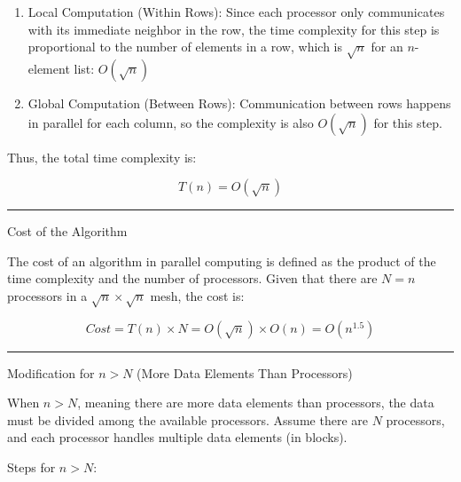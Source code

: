 \documentclass[a4paper,10pt]{article}
\begin{document}
    \begin{enumerate}
        
        \item Local Computation (Within Rows): Since each processor only communicates with its immediate neighbor in the row, the time complexity for this step is proportional to the number of elements in a row, which is $\sqrt{n}$ for an $n$-element list: $O(\sqrt{n})$

        \item Global Computation (Between Rows): Communication between rows happens in parallel for each column, so the complexity is also $O(\sqrt{n})$ for this step.

    \end{enumerate}

    Thus, the total time complexity is:

    $$T(n)= O(\sqrt{n})$$

    \begin{center}
        \noindent\rule{0.5\linewidth}{0.4pt}
    \end{center}


    {\bold Cost of the Algorithm}

    The cost of an algorithm in parallel computing is defined as the product of the time complexity and the number of processors. Given that there are $N=n$ processors in a $\sqrt{n} \times \sqrt{n}$ mesh, the cost is: 

    $$Cost = T(n) \times N = O(\sqrt{n}) \times O(n) = O(n^{1.5})$$

    \begin{center}
        \noindent\rule{0.5\linewidth}{0.4pt}
    \end{center}


    {\bold Modification for $n > N$ (More Data Elements Than Processors)}

    When $n > N$, meaning there are more data elements than processors, the data must be divided among the available processors. Assume there are $N$ processors, and each processor handles multiple data elements (in blocks).

    {\bold Steps for $n > N$:}
    
\end{document}
